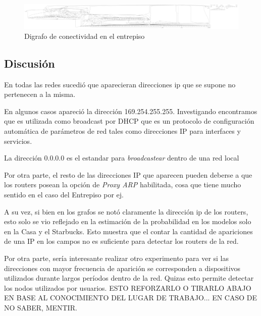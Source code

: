 \begin{figure}[H]
	\includegraphics[width=1.0\textwidth]{resultados/entrepiso/conectividad.pdf}
	\caption{Digrafo de conectividad en el entrepiso}
\end{figure}


\subsection{Discusi\'on}

        En todas las redes sucedi\'o que aparecieran direcciones ip que se supone
no pertenecen a la misma. 

        En algunos casos apareci\'o la direcci\'on 169.254.255.255. Investigando
encontramos que es utilizada como broadcast por DHCP que es un protocolo de 
configuraci\'on autom\'atica de par\'ametros de red tales como direcciones IP
para interfaces y servicios.

        La direcci\'on 0.0.0.0 es el estandar para \emph{broadcastear} dentro
de una red local

        Por otra parte, el resto de las direcciones IP que aparecen pueden deberse
a que los routers posean la opci\'on de \emph{Proxy ARP} habilitada, cosa que tiene 
mucho sentido en el caso del Entrepiso por ej.

        A su vez, si bien en los grafos se not\'o claramente la direcci\'on ip
de los routers, esto solo se vio reflejado en la estimaci\'on de la probabilidad
en los modelos solo en la Casa y el Starbucks. Esto muestra que el contar la 
cantidad de apariciones de una IP en los campos no es suficiente para detectar
los routers de la red.

        Por otra parte, ser\'ia interesante realizar otro experimento para ver
si las direcciones con mayor frecuencia de aparici\'on se corresponden a dispositivos
utilizados durante largos per\'iodos dentro de la red. Quizas esto permite detectar
los nodos utilizados por usuarios.  ESTO REFORZARLO O TIRARLO ABAJO EN BASE AL 
CONOCIMIENTO DEL LUGAR DE TRABAJO... EN CASO DE NO SABER, MENTIR.


